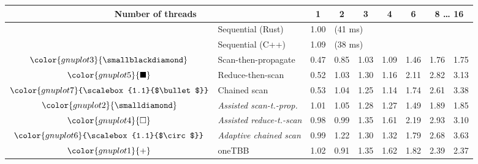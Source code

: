 \begin{tabular}{clrrrrrrr}
\toprule
\multicolumn{2}{c}{\textbf{Number of threads}} & \multicolumn{1}{c}{\textbf{ 1 }} & \multicolumn{1}{c}{\textbf{ 2 }} & \multicolumn{1}{c}{\textbf{ 3 }} & \multicolumn{1}{c}{\textbf{ 4 }} & \multicolumn{1}{c}{\textbf{ 6 }} & \multicolumn{2}{c}{\textbf{ 8 } \dots \textbf{ 16 }} \\
\midrule
& Sequential (Rust) & \multicolumn{1}{r}{ 1.00 } & \multicolumn{ 6 }{l}{(41 ms)} \\
& Sequential (C++) & \multicolumn{1}{r}{ 1.09 } & \multicolumn{ 6 }{l}{(38 ms)} \\
\rowcolor{gnuplot3!10}$\color{gnuplot3}{\smallblackdiamond}$ & Scan-then-propagate & \cellcolor{gnuplot3!10} 0.47 & \cellcolor{gnuplot3!10} 0.85 & \cellcolor{gnuplot3!10} 1.03 & \cellcolor{gnuplot3!10} 1.09 & \cellcolor{gnuplot3!10} 1.46 & \cellcolor{gnuplot3!10} 1.76 & \cellcolor{gnuplot3!10} 1.75 \\
\rowcolor{gnuplot5!10}$\color{gnuplot5}{\blacksquare}$ & Reduce-then-scan & \cellcolor{gnuplot5!10} 0.52 & \cellcolor{gnuplot5!10} 1.03 & \cellcolor{gnuplot5!10} 1.30 & \cellcolor{gnuplot5!10} 1.16 & \cellcolor{gnuplot5!10} 2.11 & \cellcolor{gnuplot5!10} 2.82 & \cellcolor{gnuplot5!10} 3.13 \\
\rowcolor{gnuplot7!10}$\color{gnuplot7}{\scalebox{1.1}{$\bullet$}}$ & Chained scan & \cellcolor{gnuplot7!10} 0.53 & \cellcolor{gnuplot7!10} 1.04 & \cellcolor{gnuplot7!10} 1.25 & \cellcolor{gnuplot7!10} 1.14 & \cellcolor{gnuplot7!10} 1.74 & \cellcolor{gnuplot7!10} 2.61 & \cellcolor{gnuplot7!10} 3.38 \\
\rowcolor{gnuplot2!30}$\color{gnuplot2}{\smalldiamond}$ & \textit{Assisted scan-t.-prop.} & \cellcolor{gnuplot2!30} 1.01 & \cellcolor{gnuplot2!30} 1.05 & \cellcolor{gnuplot2!30} 1.28 & \cellcolor{gnuplot2!30} 1.27 & \cellcolor{gnuplot2!30} 1.49 & \cellcolor{gnuplot2!30} 1.89 & \cellcolor{gnuplot2!30} 1.85 \\
\rowcolor{gnuplot4!30}$\color{gnuplot4}{\square}$ & \textit{Assisted reduce-t.-scan} & \cellcolor{gnuplot4!30} 0.98 & \cellcolor{gnuplot4!30} 0.99 & \cellcolor{gnuplot4!30} 1.35 & \cellcolor{gnuplot4!30} 1.61 & \cellcolor{gnuplot4!30} 2.19 & \cellcolor{gnuplot4!30} 2.93 & \cellcolor{gnuplot4!30} 3.10 \\
\rowcolor{gnuplot6!30}$\color{gnuplot6}{\scalebox{1.1}{$\circ$}}$ & \textit{Adaptive chained scan} & \cellcolor{gnuplot6!30} 0.99 & \cellcolor{gnuplot6!30} 1.22 & \cellcolor{gnuplot6!30} 1.30 & \cellcolor{gnuplot6!30} 1.32 & \cellcolor{gnuplot6!30} 1.79 & \cellcolor{gnuplot6!30} 2.68 & \cellcolor{gnuplot6!30} 3.63 \\
\rowcolor{gnuplot1!10}$\color{gnuplot1}{+}$ & oneTBB & \cellcolor{gnuplot1!10} 1.02 & \cellcolor{gnuplot1!10} 0.91 & \cellcolor{gnuplot1!10} 1.35 & \cellcolor{gnuplot1!10} 1.62 & \cellcolor{gnuplot1!10} 1.82 & \cellcolor{gnuplot1!10} 2.39 & \cellcolor{gnuplot1!10} 2.37 \\
\bottomrule
\end{tabular}
